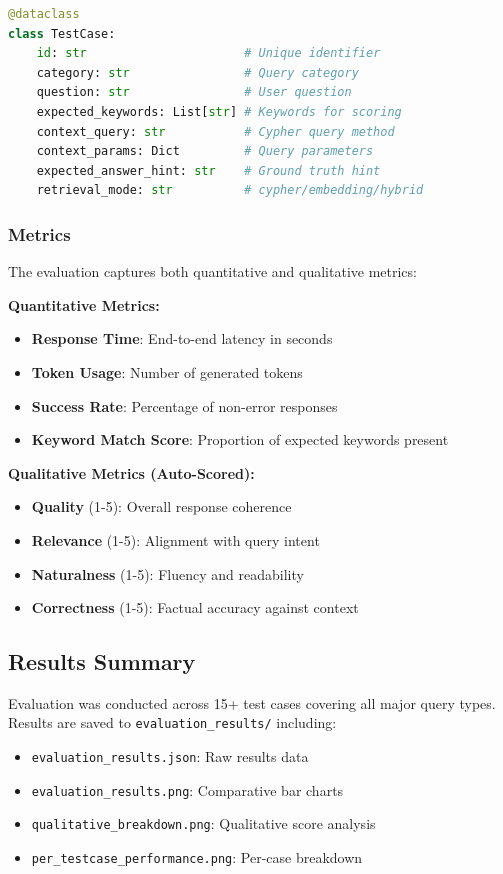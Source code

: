 \documentclass[11pt, a4paper]{article}
\begin{document}
\begin{lstlisting}[language=Python, caption={Test Case Definition}]
@dataclass
class TestCase:
    id: str                      # Unique identifier
    category: str                # Query category
    question: str                # User question
    expected_keywords: List[str] # Keywords for scoring
    context_query: str           # Cypher query method
    context_params: Dict         # Query parameters
    expected_answer_hint: str    # Ground truth hint
    retrieval_mode: str          # cypher/embedding/hybrid
\end{lstlisting}

\subsubsection{Metrics}
The evaluation captures both quantitative and qualitative metrics:

\textbf{Quantitative Metrics:}
\begin{itemize}
    \item \textbf{Response Time}: End-to-end latency in seconds
    \item \textbf{Token Usage}: Number of generated tokens
    \item \textbf{Success Rate}: Percentage of non-error responses
    \item \textbf{Keyword Match Score}: Proportion of expected keywords present
\end{itemize}

\textbf{Qualitative Metrics (Auto-Scored):}
\begin{itemize}
    \item \textbf{Quality} (1-5): Overall response coherence
    \item \textbf{Relevance} (1-5): Alignment with query intent
    \item \textbf{Naturalness} (1-5): Fluency and readability
    \item \textbf{Correctness} (1-5): Factual accuracy against context
\end{itemize}

\subsection{Results Summary}
Evaluation was conducted across 15+ test cases covering all major query types. Results are saved to \texttt{evaluation\_results/} including:
\begin{itemize}
    \item \texttt{evaluation\_results.json}: Raw results data
    \item \texttt{evaluation\_results.png}: Comparative bar charts
    \item \texttt{qualitative\_breakdown.png}: Qualitative score analysis
    \item \texttt{per\_testcase\_performance.png}: Per-case breakdown
\end{itemize}
\end{document}
